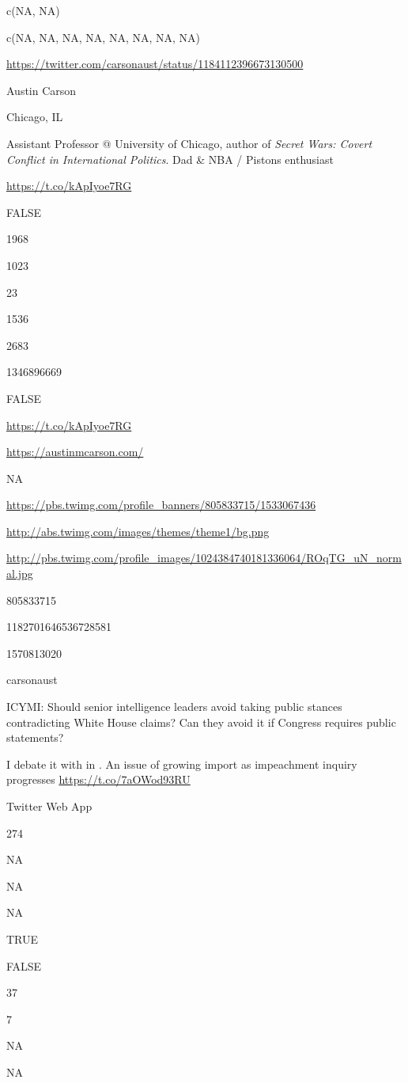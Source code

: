 \documentclass[]{book}
\begin{document}
c(NA, NA)

c(NA, NA, NA, NA, NA, NA, NA, NA)

\url{https://twitter.com/carsonaust/status/1184112396673130500}

Austin Carson

Chicago, IL

Assistant Professor @ University of Chicago, author of \emph{Secret
Wars: Covert Conflict in International Politics}. Dad \& NBA / Pistons
enthusiast

\url{https://t.co/kApIyoe7RG}

FALSE

1968

1023

23

1536

2683

1346896669

FALSE

\url{https://t.co/kApIyoe7RG}

\url{https://austinmcarson.com/}

NA

\url{https://pbs.twimg.com/profile_banners/805833715/1533067436}

\url{http://abs.twimg.com/images/themes/theme1/bg.png}

\url{http://pbs.twimg.com/profile_images/1024384740181336064/ROqTG_uN_normal.jpg}

805833715

1182701646536728581

1570813020

carsonaust

ICYMI: Should senior intelligence leaders avoid taking public stances
contradicting White House claims? Can they avoid it if Congress requires
public statements?

I debate it with \citet{JoshRovner1} in \citet{lawfareblog}. An issue of
growing import as impeachment inquiry progresses
\url{https://t.co/7aOWod93RU}

Twitter Web App

274

NA

NA

NA

TRUE

FALSE

37

7

NA

NA
\end{document}
